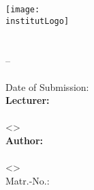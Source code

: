 
\begin{titlepage}
  \begin{center}
    \sffamily

    \texttt{[image: \\institutLogo]}\\[4ex]

    \huge{\institutName}\\[1ex]
    \LARGE{\fakultaet}\\[1ex]
    \Large{{\studiengang} -- \studiengangKuerzel}\\[50pt]

    \huge{\textbf{\titel}}\\[1ex]
    \large{Date of Submission: \abgabeTermin}\\[50pt]

    \large
    \textbf{Lecturer:}\\
    \\
    <>\\[3ex]

    \textbf{Author:}\\
    \autorName\\
    <\autorEmail>\\
    Matr.-No.: \autorMatnr\\[50pt]

    \semester
  \end{center}
\end{titlepage}
